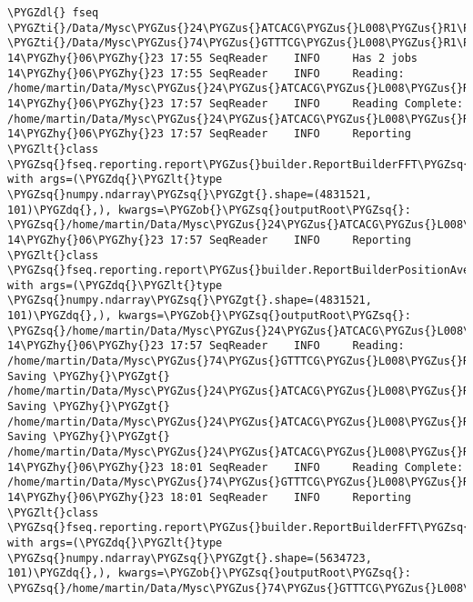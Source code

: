 \documentclass[letterpaper,10pt,english]{sphinxmanual}
\def\PYGZus{\char`\_}
\def\PYGZob{\char`\{}
\def\PYGZcb{\char`\}}
\def\PYGZlt{\char`\<}
\def\PYGZgt{\char`\>}
\def\PYGZdl{\char`\$}
\def\PYGZhy{\char`\-}
\def\PYGZsq{\char`\'}
\def\PYGZdq{\char`\"}
\def\PYGZti{\char`\~}
\begin{document}
\begin{Verbatim}[commandchars=\\\{\}]
\PYGZdl{} fseq \PYGZti{}/Data/Mysc\PYGZus{}24\PYGZus{}ATCACG\PYGZus{}L008\PYGZus{}R1\PYGZus{}001.fastq \PYGZti{}/Data/Mysc\PYGZus{}74\PYGZus{}GTTTCG\PYGZus{}L008\PYGZus{}R1\PYGZus{}001.fastq
14\PYGZhy{}06\PYGZhy{}23 17:55 SeqReader    INFO     Has 2 jobs
14\PYGZhy{}06\PYGZhy{}23 17:55 SeqReader    INFO     Reading: /home/martin/Data/Mysc\PYGZus{}24\PYGZus{}ATCACG\PYGZus{}L008\PYGZus{}R1\PYGZus{}001.fastq
14\PYGZhy{}06\PYGZhy{}23 17:57 SeqReader    INFO     Reading Complete: /home/martin/Data/Mysc\PYGZus{}24\PYGZus{}ATCACG\PYGZus{}L008\PYGZus{}R1\PYGZus{}001.fastq
14\PYGZhy{}06\PYGZhy{}23 17:57 SeqReader    INFO     Reporting \PYGZlt{}class \PYGZsq{}fseq.reporting.report\PYGZus{}builder.ReportBuilderFFT\PYGZsq{}\PYGZgt{} with args=(\PYGZdq{}\PYGZlt{}type \PYGZsq{}numpy.ndarray\PYGZsq{}\PYGZgt{}.shape=(4831521, 101)\PYGZdq{},), kwargs=\PYGZob{}\PYGZsq{}outputRoot\PYGZsq{}: \PYGZsq{}/home/martin/Data/Mysc\PYGZus{}24\PYGZus{}ATCACG\PYGZus{}L008\PYGZus{}R1\PYGZus{}001.fastq.reports\PYGZsq{}\PYGZcb{}
14\PYGZhy{}06\PYGZhy{}23 17:57 SeqReader    INFO     Reporting \PYGZlt{}class \PYGZsq{}fseq.reporting.report\PYGZus{}builder.ReportBuilderPositionAverage\PYGZsq{}\PYGZgt{} with args=(\PYGZdq{}\PYGZlt{}type \PYGZsq{}numpy.ndarray\PYGZsq{}\PYGZgt{}.shape=(4831521, 101)\PYGZdq{},), kwargs=\PYGZob{}\PYGZsq{}outputRoot\PYGZsq{}: \PYGZsq{}/home/martin/Data/Mysc\PYGZus{}24\PYGZus{}ATCACG\PYGZus{}L008\PYGZus{}R1\PYGZus{}001.fastq.reports\PYGZsq{}\PYGZcb{}
14\PYGZhy{}06\PYGZhy{}23 17:57 SeqReader    INFO     Reading: /home/martin/Data/Mysc\PYGZus{}74\PYGZus{}GTTTCG\PYGZus{}L008\PYGZus{}R1\PYGZus{}001.fastq
Saving \PYGZhy{}\PYGZgt{} /home/martin/Data/Mysc\PYGZus{}24\PYGZus{}ATCACG\PYGZus{}L008\PYGZus{}R1\PYGZus{}001.fastq.reports/fft\PYGZhy{}sample.abs.heatmap.pdf
Saving \PYGZhy{}\PYGZgt{} /home/martin/Data/Mysc\PYGZus{}24\PYGZus{}ATCACG\PYGZus{}L008\PYGZus{}R1\PYGZus{}001.fastq.reports/average.total.line.pdf
Saving \PYGZhy{}\PYGZgt{} /home/martin/Data/Mysc\PYGZus{}24\PYGZus{}ATCACG\PYGZus{}L008\PYGZus{}R1\PYGZus{}001.fastq.reports/fft\PYGZhy{}sample.angle.heatmap.pdf
14\PYGZhy{}06\PYGZhy{}23 18:01 SeqReader    INFO     Reading Complete: /home/martin/Data/Mysc\PYGZus{}74\PYGZus{}GTTTCG\PYGZus{}L008\PYGZus{}R1\PYGZus{}001.fastq
14\PYGZhy{}06\PYGZhy{}23 18:01 SeqReader    INFO     Reporting \PYGZlt{}class \PYGZsq{}fseq.reporting.report\PYGZus{}builder.ReportBuilderFFT\PYGZsq{}\PYGZgt{} with args=(\PYGZdq{}\PYGZlt{}type \PYGZsq{}numpy.ndarray\PYGZsq{}\PYGZgt{}.shape=(5634723, 101)\PYGZdq{},), kwargs=\PYGZob{}\PYGZsq{}outputRoot\PYGZsq{}: \PYGZsq{}/home/martin/Data/Mysc\PYGZus{}74\PYGZus{}GTTTCG\PYGZus{}L008\PYGZus{}R1\PYGZus{}001.fastq.reports\PYGZsq{}\PYGZcb{}

\end{Verbatim}
\end{document}

